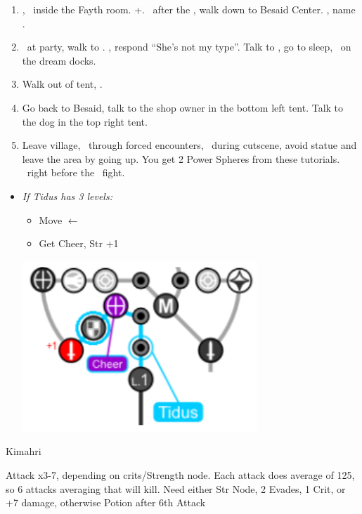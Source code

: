 \begin{enumerate}[resume]
	\item \cs[1:00], \sd\ inside the Fayth room. \fmv+\cs[1:00]. \sd\ after the \fmv, walk down to Besaid Center. \cs[1:40], name \valefor.
	\item \sd\ at party, walk to \yuna. \sd, respond ``She's not my type''. Talk to \wakka, go to sleep, \sd\ on the dream docks.
	\item Walk out of tent, \sd.
	\item Go back to Besaid, talk to the shop owner in the bottom left tent. Talk to the dog in the top right tent.
	\item Leave village, \sd\ through forced encounters, \sd\ during cutscene, avoid statue and leave the area by going up. You get 2 Power Spheres from these tutorials. \skippablefmv\ right before the \kimahri\ fight.
\end{enumerate}
\begin{spheregrid}
	\begin{itemize}
		\item \textit{If Tidus has 3 levels:}
		      \begin{itemize}
			      \item Move $\leftarrow$
			      \item Get Cheer, Str +1
		      \end{itemize}
		      \includegraphics{graphics/tiduscheer}
	\end{itemize}
\end{spheregrid}
\begin{battle}[750]{Kimahri}
	\begin{itemize}
		\tidusf Attack x3-7, depending on crits/Strength node.
		\tidusf Each attack does average of 125, so 6 attacks averaging that will kill.
		\tidusf Need either Str Node, 2 Evades, 1 Crit, or +7 damage, otherwise Potion after 6th Attack
	\end{itemize}
\end{battle}
